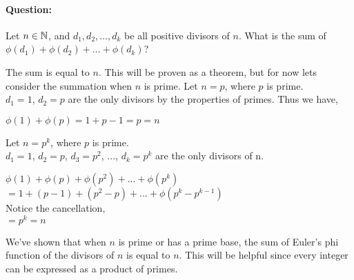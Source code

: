 \documentclass[../main.tex]{subfiles}
\begin{document}
\paragraph{Question:} Let $n \in \mathbb{N}$, and $d_1,d_2,...,d_k$ be all positive divisors of $n$. What is the sum of $\phi(d_1) + \phi(d_2) + ... + \phi(d_k)$?
\begin{ans}
    The sum is equal to $n$. This will be proven as a theorem, but for now lets consider the summation when $n$ is prime. \sspace
    Let $n=p$, where $p$ is prime. \\
    $d_1=1$, $d_2=p$ are the only divisors by the properties of primes. Thus we have, \\
    \centerline{$\phi(1) + \phi(p) = 1 + p-1 = p=n$}
    
    Let $n=p^k$, where $p$ is prime. \\
    $d_1=1$, $d_2=p$, $d_3=p^2$, $...$, $d_k=p^k$ are the only divisors of n.
    \begin{center}
        $\phi(1)+\phi(p)+\phi(p^2)+...+\phi(p^k)$ \\
        $=1+(p-1)+(p^2-p)+...+\phi(p^k-p^{k-1})$ \\
        Notice the cancellation, \\
        $=p^k=n$
    \end{center}
    We've shown that when $n$ is prime or has a prime base, the sum of Euler's phi function of the divisors of $n$ is equal to $n$. This will be helpful since every integer can be expressed as a product of primes.
\end{ans}
\end{document}
